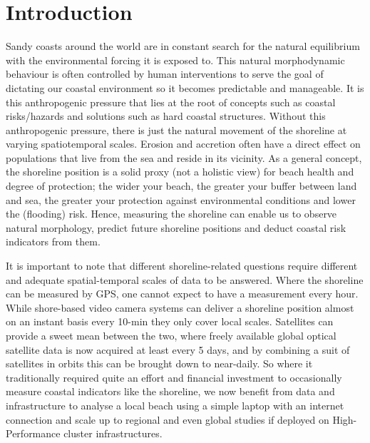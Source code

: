 \documentclass[remotesensing,article,submit,pdftex,moreauthors]{Definitions/mdpi}
\begin{document}
\section{Introduction}
Sandy coasts around the world are in constant search for the natural equilibrium with the environmental forcing it is exposed to. This natural morphodynamic behaviour is often controlled by human interventions to serve the goal of dictating our coastal environment so it becomes predictable and manageable. It is this anthropogenic pressure that lies at the root of concepts such as coastal risks/hazards and solutions such as hard coastal structures. Without this anthropogenic pressure, there is just the natural movement of the shoreline at varying spatiotemporal scales. Erosion and accretion often have a direct effect on populations that live from the sea and reside in its vicinity. As a general concept, the shoreline position is a solid proxy (not a holistic view) for beach health and degree of protection; the wider your beach, the greater your buffer between land and sea, the greater your protection against environmental conditions and lower the (flooding) risk. Hence, measuring the shoreline can enable us to observe natural morphology, predict future shoreline positions and deduct coastal risk indicators from them.

It is important to note that different shoreline-related questions require different and adequate spatial-temporal scales of data to be answered. Where the shoreline can be measured by GPS, one cannot expect to have a measurement every hour. While shore-based video camera systems can deliver a shoreline position almost on an instant basis every 10-min they only cover local scales. Satellites can provide a sweet mean between the two, where freely available global optical satellite data is now acquired at least every 5 days, and by combining a suit of satellites in orbits this can be brought down to near-daily. So where it traditionally required quite an effort and financial investment to occasionally measure coastal indicators like the shoreline, we now benefit from data and infrastructure to analyse a local beach using a simple laptop with an internet connection and scale up to regional and even global studies if deployed on High-Performance cluster infrastructures. 
\end{document}
